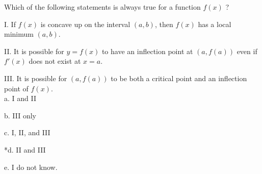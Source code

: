
Which of the following statements is always true for a function \( f(x) \) ?

I. If \( f(x) \) is concave up on the interval \( (a,b) \), then \( f(x) \) has a local minimum \( (a,b) \).

II. It is possible for \( y=f(x) \) to have an inflection point at  \( (a,f(a)) \) even if \( f'(x) \) does not exist at \( x=a \).

III. It is possible for \( (a,f(a)) \) to be both a critical point and an inflection point of \( f(x) \).\\

a. I and II

b. III only

c. I, II, and III

*d. II and III

e. I do not know.\\
